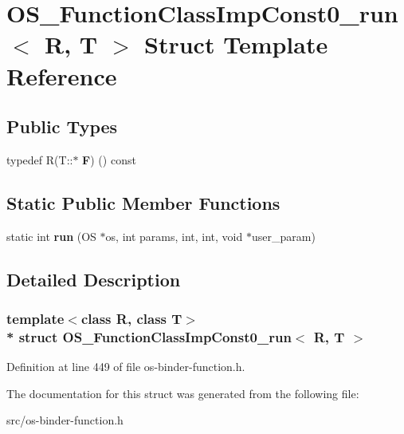 \hypertarget{struct_o_s___function_class_imp_const0__run}{}\section{O\+S\+\_\+\+Function\+Class\+Imp\+Const0\+\_\+run$<$ R, T $>$ Struct Template Reference}
\label{struct_o_s___function_class_imp_const0__run}
\subsection*{Public Types}
\begin{DoxyCompactItemize}
\item 
typedef R(T\+::$\ast$ {\bfseries F}) () const \hypertarget{struct_o_s___function_class_imp_const0__run_a9dd0d470f48f4e1a7a3d535397a55e20}{}\label{struct_o_s___function_class_imp_const0__run_a9dd0d470f48f4e1a7a3d535397a55e20}

\end{DoxyCompactItemize}
\subsection*{Static Public Member Functions}
\begin{DoxyCompactItemize}
\item 
static int {\bfseries run} (OS $\ast$os, int params, int, int, void $\ast$user\+\_\+param)\hypertarget{struct_o_s___function_class_imp_const0__run_abd21291a90879000f70674a0c0d038d2}{}\label{struct_o_s___function_class_imp_const0__run_abd21291a90879000f70674a0c0d038d2}

\end{DoxyCompactItemize}


\subsection{Detailed Description}
\subsubsection*{template$<$class R, class T$>$\\*
struct O\+S\+\_\+\+Function\+Class\+Imp\+Const0\+\_\+run$<$ R, T $>$}



Definition at line 449 of file os-\/binder-\/function.\+h.



The documentation for this struct was generated from the following file\+:\begin{DoxyCompactItemize}
\item 
src/os-\/binder-\/function.\+h\end{DoxyCompactItemize}
